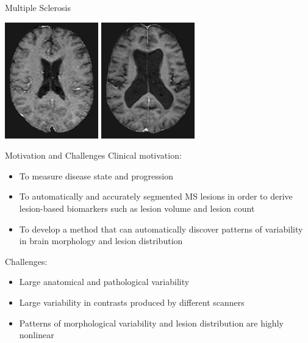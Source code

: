 \documentclass{beamer}
\begin{document}
\begin{frame}{Multiple Sclerosis}
\begin{center}
{\includegraphics[height=0.35\textwidth]{images/mediumatrophy}\quad
\includegraphics[height=0.35\textwidth]{images/highatrophy}%
}
\end{center}
\end{frame}

\begin{frame}{Motivation and Challenges}
Clinical motivation:
\begin{itemize}
\item \alert{To measure disease state and progression}
\item To automatically and accurately segmented MS lesions in order to derive
lesion-based biomarkers such as lesion volume and lesion count
\item To develop a method that can automatically discover patterns of
variability in brain morphology and lesion distribution
\end{itemize}
\vspace{0.5em}
Challenges:
\begin{itemize}
\item Large anatomical and pathological variability
\item Large variability in contrasts produced by different scanners
\item Patterns of morphological variability and lesion
distribution are highly nonlinear 
\end{itemize}
\end{frame}
\end{document}
